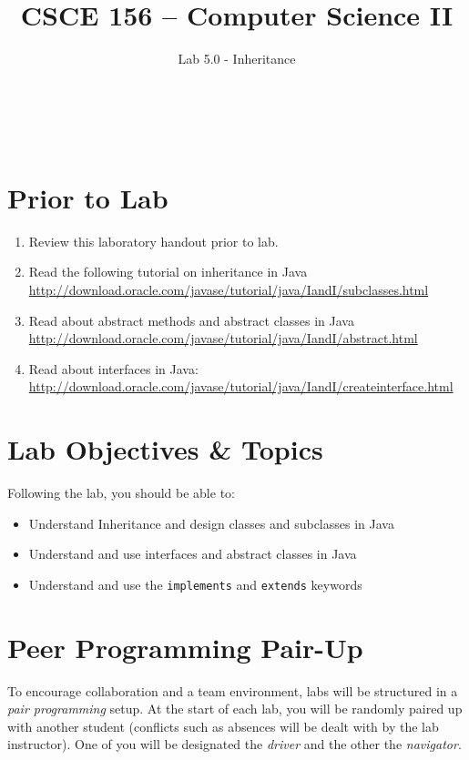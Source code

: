 \documentclass[12pt]{scrartcl}
\title{CSCE 156 -- Computer Science II}
\subtitle{Lab 5.0 - Inheritance}
\author{~}
\date{~}
\begin{document}
\maketitle

\section*{Prior to Lab}

\begin{enumerate}
  \item Review this laboratory handout prior to lab.
  \item Read the following tutorial on inheritance in Java\\
	\url{http://download.oracle.com/javase/tutorial/java/IandI/subclasses.html} 
  \item Read about abstract methods and abstract classes in Java \\
	\url{http://download.oracle.com/javase/tutorial/java/IandI/abstract.html}
  \item Read about interfaces in Java: \\
	\url{http://download.oracle.com/javase/tutorial/java/IandI/createinterface.html}
\end{enumerate}

\section*{Lab Objectives \& Topics}
Following the lab, you should be able to:
\begin{itemize}
  \item Understand Inheritance and design classes and subclasses in Java
  \item Understand and use interfaces and abstract classes in Java
  \item Understand and use the \texttt{implements} and 
  	\texttt{extends} keywords
\end{itemize}


\section*{Peer Programming Pair-Up}

To encourage collaboration and a team environment, labs will be
structured in a \emph{pair programming} setup.  At the start of
each lab, you will be randomly paired up with another student 
(conflicts such as absences will be dealt with by the lab instructor).
One of you will be designated the \emph{driver} and the other
the \emph{navigator}.  
\end{document}
